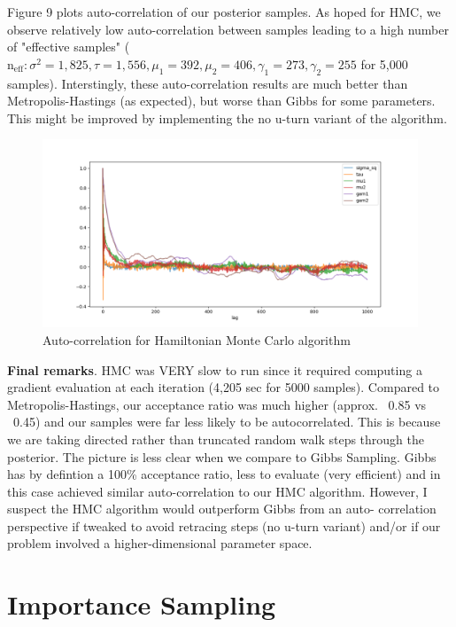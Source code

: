 \documentclass[12pt,letterpaper,twoside]{article}
\begin{document}
Figure 9 plots auto-correlation of our posterior samples. As hoped
for HMC, we observe relatively low auto-correlation between 
samples leading to a high number of "effective samples" ($\text{n}_{\text{eff}}: \sigma^2=1,825, \tau=1,556, \mu_1=392, \mu_2=406, \gamma_1=273, \gamma_2=255$ 
for 5,000 samples). Interstingly, these auto-correlation results are 
much better than Metropolis-Hastings (as expected), but worse than 
Gibbs for some parameters. This might be improved by implementing the 
no u-turn variant of the algorithm. 
\begin{figure}[H]
    \centering
    \includegraphics[scale=0.6]{hmc_autocorr_plot.png}
    \vspace*{-10mm}
    \caption{Auto-correlation for Hamiltonian Monte Carlo algorithm}
\end{figure}

\textbf{Final remarks}. HMC was VERY slow to run since it required 
computing a gradient evaluation at each iteration (4,205 sec 
for 5000 samples). Compared to Metropolis-Hastings, our acceptance ratio 
was much higher (approx. ~0.85 vs ~0.45) and our samples were far less likely 
to be autocorrelated. This is because we are taking directed rather than 
truncated random walk steps through the posterior. The picture is 
less clear when we compare to Gibbs Sampling. Gibbs has by defintion 
a 100\% acceptance ratio, less to evaluate (very efficient) and in this 
case achieved similar auto-correlation to our HMC algorithm. However, 
I suspect the HMC algorithm would outperform Gibbs from an auto-
correlation perspective if tweaked to avoid retracing steps (no u-turn 
variant) and/or if our problem involved a higher-dimensional parameter space.



\section{Importance Sampling}
\end{document}
